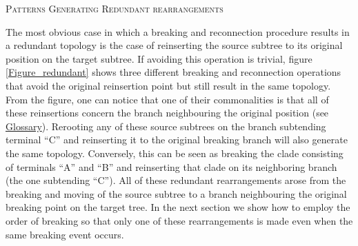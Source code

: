\documentclass[12pt,letterpaper]{article}
\renewcommand{\section}[1]{%
\bigskip
\begin{center}
\begin{Large}
\normalfont\scshape #1
\medskip
\end{Large}
\end{center}}
\begin{document}
\section{Patterns Generating Redundant rearrangements}
The most obvious case in which a breaking and reconnection procedure results in a redundant topology is the case of reinserting the source subtree to its original position on the target subtree.
If avoiding this operation is trivial, figure \ref{Figure_redundant} shows three different breaking and reconnection operations that avoid the original reinsertion point but still result in the same topology. 
From the figure, one can notice that one of their commonalities is that all of these reinsertions concern the branch neighbouring the original position (see \hyperref[Glossary]{Glossary}).
Rerooting any of these source subtrees on the branch subtending terminal ``C'' and reinserting it to the original breaking branch will also generate the same topology.
Conversely, this can be seen as breaking the clade consisting of terminals ``A'' and ``B'' and reinserting that clade on its neighboring branch (the one subtending ``C'').
All of these redundant rearrangements arose from the breaking and moving of the source subtree to a branch neighbouring the original breaking point on the target tree.
In the next section we show how to employ the order of breaking so that only one of these rearrangements is made even when the same breaking event occurs.
\end{document}
